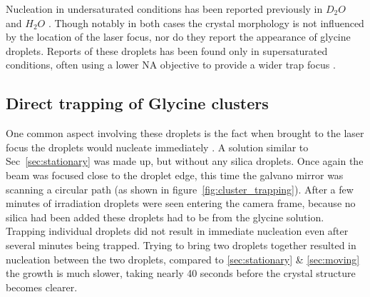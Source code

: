 Nucleation in undersaturated conditions has been reported previously in $D_2O$ 
\cite{Rungsimanon2010} and $H_2O$ \cite{Flannigan2023}. Though notably in both 
cases the crystal morphology is not influenced by the location of the laser focus, 
nor do they report the appearance of glycine droplets. Reports of these droplets
has been found only in supersaturated conditions, often using a lower NA objective
to provide a wider trap focus \cite{Liao2022, Yuyama2010, Yuyama2012}.  

\subsection{Direct trapping of Glycine clusters}
\label{sec:clusters}
One common aspect involving these droplets is the fact when brought to the laser 
focus the droplets would nucleate immediately \cite{Liao2022}. A solution similar 
to Sec~\ref{sec:stationary} was made up, but without any silica droplets. Once 
again the beam was focused close to the droplet edge, this time the galvano mirror
was scanning a circular path (as shown in figure~\ref{fig:cluster_trapping}). 
After a few minutes of irradiation droplets were seen entering the camera frame, 
because no silica had been added these droplets had to be from the glycine solution. Trapping individual droplets did not result in immediate nucleation even after 
several minutes being trapped. Trying to bring two droplets together resulted in nucleation between the two droplets, compared to \ref{sec:stationary} \& 
\ref{sec:moving} the growth is much slower, taking nearly 40 seconds before the 
crystal structure becomes clearer.
